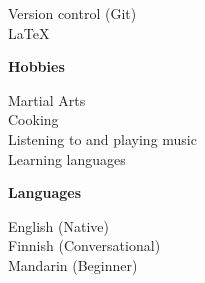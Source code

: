 \documentclass[a4paper]{article}
\newcommand{\mytitle}[1]{{\Large \textbf{#1}} \vspace{0.2cm}}
\begin{document}
\begin{minipage}[t]{0.3\linewidth}
{        Version control (Git) \\

        {\large \LaTeX} \\
        
    }

    \vspace{0.5cm}
    {
        \mytitle{Hobbies}

        Martial Arts \\
        Cooking \\
        Listening to and playing music \\
        Learning languages \\

    }
    \vspace{0.2cm}
    {
        \mytitle{Languages}

        English (Native) \\
        Finnish (Conversational) \\
        Mandarin (Beginner)
    }
%
%
\end{minipage}
%
\end{document}

